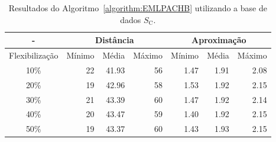 \begin{table}[!htb]
  \caption{Resultados do Algoritmo~\ref{algorithm:EMLPACHB} utilizando a base de dados $S_{\text{C}}$.}
  \label{table:XQLOOFHX}
  \centering
  \begin{tabular}{|c|r|r|r|r|r|r|}
    \hline
      -            & \multicolumn{3}{c|}{Distância}             & \multicolumn{3}{c|}{Aproximação}           \\ \hline
    Flexibilização & Mínimo       & Média        & Máximo       & Mínimo       & Média        & Máximo       \\ \hline  
    10\%           & 22           & 41.93        & 56           & 1.47         & 1.91         & 2.08         \\ \hline
    20\%           & 19           & 42.96        & 58           & 1.53         & 1.92         & 2.15         \\ \hline
    30\%           & 21           & 43.39        & 60           & 1.47         & 1.92         & 2.14         \\ \hline
    40\%           & 20           & 43.47        & 59           & 1.40         & 1.92         & 2.15         \\ \hline
    50\%           & 19           & 43.37        & 60           & 1.43         & 1.93         & 2.15         \\ \hline    
  \end{tabular}
\end{table}